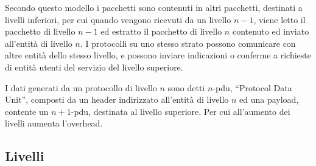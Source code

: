 \documentclass{article}
\numberwithin{equation}{subsection}
\begin{document}
Secondo questo modello i pacchetti sono contenuti in altri pacchetti, destinati a livelli inferiori, per cui quando vengono ricevuti da un livello $n-1$, viene letto 
il pacchetto di livello $n-1$ ed estratto il pacchetto di livello $n$ contenuto ed inviato all'entità di livello $n$. 
I protocolli su uno stesso strato possono comunicare con altre entità dello stesso livello, e possono inviare indicazioni o conferme a richieste di entità utenti del 
servizio del livello superiore. 

I dati generati da un protocollo di livello $n$ sono detti $n$-pdu, ``Protocol Data Unit'', composti da un header indirizzato all'entità di livello $n$ ed una payload, 
contente un $n+1$-pdu, destinata al livello superiore. Per cui all'aumento dei livelli aumenta l'overhead. 

\subsection{Livelli}
\end{document}
